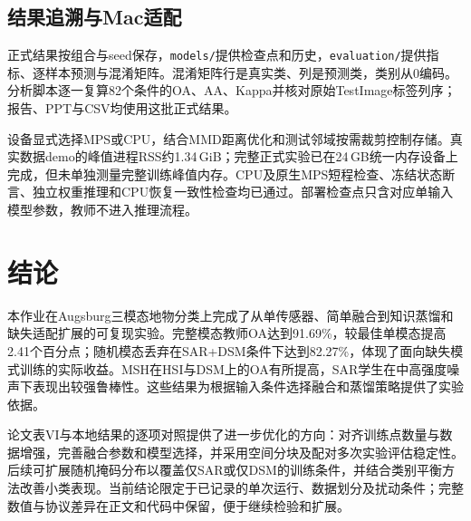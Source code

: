 \documentclass[conference,10pt]{IEEEtran}
\begin{document}
\subsection{结果追溯与Mac适配}
正式结果按组合与seed保存，\texttt{models/}提供检查点和历史，\texttt{evaluation/}提供指标、逐样本预测与混淆矩阵。混淆矩阵行是真实类、列是预测类，类别从0编码。分析脚本逐一复算82个条件的OA、AA、Kappa并核对原始TestImage标签列序；报告、PPT与CSV均使用这批正式结果。

设备显式选择MPS或CPU，结合MMD距离优化和测试邻域按需裁剪控制存储。真实数据demo的峰值进程RSS约1.34\,GiB；完整正式实验已在24\,GB统一内存设备上完成，但未单独测量完整训练峰值内存。CPU及原生MPS短程检查、冻结状态断言、独立权重推理和CPU恢复一致性检查均已通过。部署检查点只含对应单输入模型参数，教师不进入推理流程。

\section{结论}
本作业在Augsburg三模态地物分类上完成了从单传感器、简单融合到知识蒸馏和缺失适配扩展的可复现实验。完整模态教师OA达到91.69\%，较最佳单模态提高2.41个百分点；随机模态丢弃在SAR+DSM条件下达到82.27\%，体现了面向缺失模式训练的实际收益。MSH在HSI与DSM上的OA有所提高，SAR学生在中高强度噪声下表现出较强鲁棒性。这些结果为根据输入条件选择融合和蒸馏策略提供了实验依据。

论文表VI与本地结果的逐项对照提供了进一步优化的方向：对齐训练点数量与数据增强，完善融合参数和模型选择，并采用空间分块及配对多次实验评估稳定性。后续可扩展随机掩码分布以覆盖仅SAR或仅DSM的训练条件，并结合类别平衡方法改善小类表现。当前结论限定于已记录的单次运行、数据划分及扰动条件；完整数值与协议差异在正文和代码中保留，便于继续检验和扩展。



\end{document}
